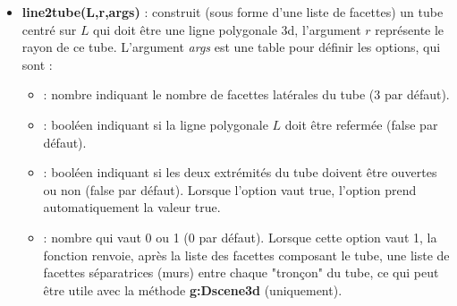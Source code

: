 \begin{itemize}
\begin{demo}{Section d'un cylindre non circulaire}
\begin{luadraw}{name=curve2cylinder}
local cos, sin, pi = math.cos, math.sin, math.pi
local g = graph3d:new{ window3d={-5,5,-5,5,-4,4},window={-9,8,-7,7},viewdir={39,70},size={10,10}}
g:Linejoin("round")
local f = function(t) return M(4*cos(t)-cos(4*t),4*sin(t)-sin(4*t),-4) end -- courbe dans le plan z=-3
local V = 8*vecK
local C = curve2cylinder(f,-pi,pi,V,{nbdots=25,nbdiv=2})
local plan = {M(0,0,2), -vecK} -- plan de coupe z=2
local C1, C2, section = cutfacet(C,plan)
g:Dboxaxes3d({grid=true,gridcolor="gray",fillcolor="LightGray"})
g:Dfacet(C1, {mode=3,color="LightBlue"})  -- partie sous le plan
g:Dfacet(g:Plane2facet(plan), {opacity=0.3,color="Chocolate"}) -- dessin du plan sous forme d'une facette
g:Filloptions("fdiag","red"); g:Dpolyline3d(section) -- dessin de la section
g:Dfacet(C2, {mode=3,color="LightBlue"})  -- partie du cylindre au dessus du plan
g:Show()
\end{luadraw}
\end{demo}

    \item \textbf{line2tube(L,r,args)} : construit (sous forme d'une liste de facettes) un tube centré sur $L$ qui doit être une ligne polygonale 3d, l'argument $r$ représente le rayon de ce tube. L'argument \emph{args} est une table pour définir les options, qui sont :
    \begin{itemize}
        \item {} : nombre indiquant le nombre de facettes latérales du tube (3 par défaut).
        \item {} : booléen indiquant si la ligne polygonale $L$ doit être refermée (false par défaut).
        \item {} : booléen indiquant si les deux extrémités du tube doivent être ouvertes ou non (false par défaut). Lorsque l'option  vaut true, l'option  prend automatiquement la valeur true.
        \item {} : nombre qui vaut 0 ou 1 (0 par défaut). Lorsque cette option vaut 1, la fonction renvoie, après la liste des facettes composant le tube, une liste de facettes séparatrices (murs) entre chaque "tronçon" du tube, ce qui peut être utile avec la méthode \textbf{g:Dscene3d} (uniquement).
    \end{itemize}
    

\end{itemize}
